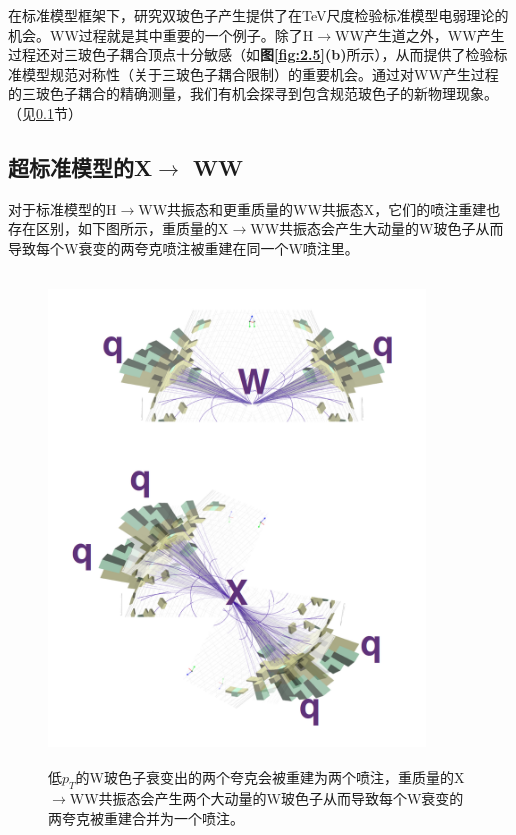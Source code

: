 在标准模型框架下，研究双玻色子产生提供了在TeV尺度检验标准模型电弱理论的机会。WW过程就是其中重要的一个例子。除了H$\to$WW产生道之外，WW产生过程还对三玻色子耦合顶点十分敏感（如\textbf{图\ref{fig:2.5}(b)}所示），从而提供了检验标准模型规范对称性（关于三玻色子耦合限制）的重要机会。通过对WW产生过程的三玻色子耦合的精确测量，我们有机会探寻到包含规范玻色子的新物理现象。（见\ref{sec:2.3.2}节）

\subsection{超标准模型的X$\to$ WW}\label{sec:2.3.2}
对于标准模型的H$\to$WW共振态和更重质量的WW共振态X，它们的喷注重建也存在区别，如下图所示，重质量的X$\to$WW共振态会产生大动量的W玻色子从而导致每个W衰变的两夸克喷注被重建在同一个W喷注里。
\begin{figure}[H]
 \centering
 \includegraphics[height=13cm, width=10cm]{pictures/massiveXWW.png}
  \caption{低$p_T$的W玻色子衰变出的两个夸克会被重建为两个喷注，重质量的X$\to$WW共振态会产生两个大动量的W玻色子从而导致每个W衰变的两夸克被重建合并为一个喷注。\cite{Boosting_the_Higgs_boson}}
 \label{fig:2.6}
\end{figure}

